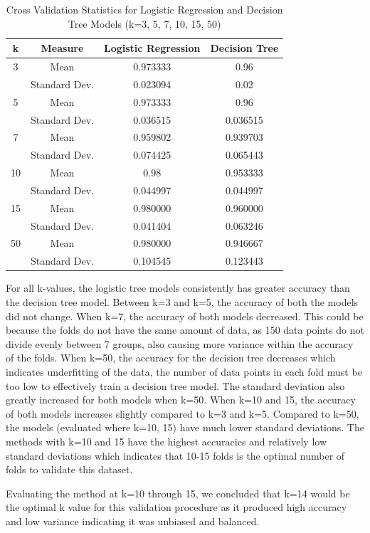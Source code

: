 \documentclass[journal]{IEEEtran}
\begin{document}
\begin{table}[h!]
\centering
\begin{tabular}{ c | c | c c }
k & Measure & Logistic Regression & Decision Tree \\
\hline
3 & Mean & 0.973333 & 0.96 \\
& Standard Dev.  & 0.023094 & 0.02 \\
\hline
5 & Mean & 0.973333 & 0.96 \\
& Standard Dev.  & 0.036515 & 0.036515 \\
 \hline
7 & Mean & 0.959802 & 0.939703 \\
 & Standard Dev.  & 0.074425 & 0.065443 \\
 \hline
10 & Mean & 0.98 & 0.953333 \\
 & Standard Dev.  & 0.044997 & 0.044997 \\
 \hline
15 & Mean&	0.980000&	0.960000 \\
&Standard Dev.&	0.041404&	0.063246 \\
\hline
50 & Mean &	0.980000 &	0.946667 \\
 & Standard Dev. &	0.104545 &	0.123443
\end{tabular}
\caption{Cross Validation Statistics for Logistic Regression and Decision Tree Models (k=3, 5, 7, 10, 15, 50)}
\label{table:MultiFoldCV}
\end{table}

For all k-values, the logistic tree models consistently has greater accuracy than the decision tree model. Between k=3 and k=5, the accuracy of both the models did not change. When k=7, the accuracy of both models decreased. This could be because the folds do not have the same amount of data, as 150 data points do not divide evenly between 7 groups, also causing more variance within the accuracy of the folds. When k=50, the accuracy for the decision tree decreases which indicates underfitting of the data, the number of data points in each fold must be too low to effectively train a decision tree model. The standard deviation also greatly increased for both models when k=50. When k=10 and 15, the accuracy of both models increases slightly compared to k=3 and k=5. Compared to k=50, the models (evaluated where k=10, 15) have much lower standard deviations. The methods with k=10 and 15 have the highest accuracies and relatively low standard deviations which indicates that 10-15 folds is the optimal number of folds to validate this dataset.

\vspace{60px}
Evaluating the method at k=10 through 15, we concluded that k=14 would be the optimal k value for this validation procedure as it produced high accuracy and low variance indicating it was unbiased and balanced. 
\end{document}
